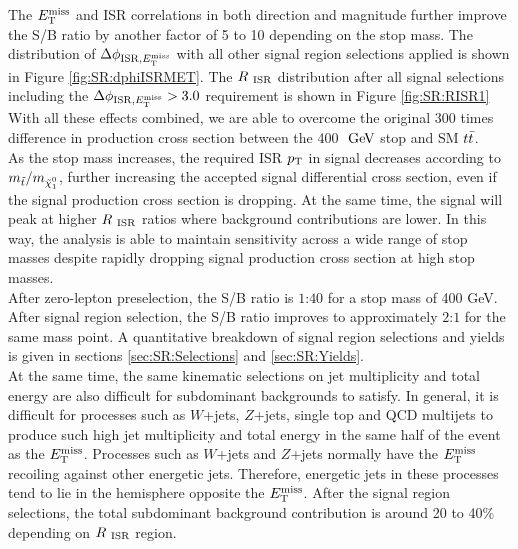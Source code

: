 \indent The $E_{\mathrm{T}}^{\mathrm{miss}}$ and ISR correlations in both direction and magnitude further improve the S/B ratio by another factor of 5 to 10 depending on the stop mass.  The distribution of $\Delta\phi_{\mathrm{ISR},E_{\mathrm{T}}^{\mathrm{miss}}}$ with all other signal region selections applied is shown in Figure \ref{fig:SR:dphiISRMET}. The $R_{~\mathrm{ISR}}$ distribution after all signal selections including the $\Delta\phi_{\mathrm{ISR},E_{\mathrm{T}}^{\mathrm{miss}}} > 3.0 $ requirement is shown in Figure \ref{fig:SR:RISR1} \\

\indent With all these effects combined, we are able to overcome the original 300 times difference in production cross section between the 400 $\gev$ stop and SM $t\bar{t}$.  \\

\indent As the stop mass increases, the required ISR $p_{\mathrm{T}}$ in signal decreases according to $m_{\stop}/m_{\ninoone}$, further increasing the accepted signal differential cross section, even if the signal production cross section is dropping.  At the same time, the signal will peak at higher $R_{~\mathrm{ISR}}$ ratios where background contributions are lower.  In this way, the analysis is able to maintain sensitivity across a wide range of stop masses despite rapidly dropping signal production cross section at high stop masses.  \\

\indent After zero-lepton preselection, the S/B ratio is $1$:$40$ for a stop mass of 400 GeV.  After signal region selection, the S/B ratio improves to approximately $2$:$1$ for the same mass point.  A quantitative breakdown of signal region selections and yields is given in sections \ref{sec:SR:Selections} and \ref{sec:SR:Yields}.  \\

\indent At the same time, the same kinematic selections on jet multiplicity and total energy are also difficult for subdominant backgrounds to satisfy.  In general, it is difficult for processes such as $W$+jets, $Z$+jets, single top and QCD multijets to produce such high jet multiplicity and total energy in the same half of the event as the $E_{\mathrm{T}}^{\mathrm{miss}}$.   Processes such as $W$+jets and $Z$+jets normally have the $E_{\mathrm{T}}^{\mathrm{miss}}$ recoiling against other energetic jets.  Therefore, energetic jets in these processes tend to lie in the hemisphere opposite the $E_{\mathrm{T}}^{\mathrm{miss}}$.  After the signal region selections, the total subdominant background contribution is around 20 to 40\% depending on $R_{~\mathrm{ISR}}$ region.  \\




